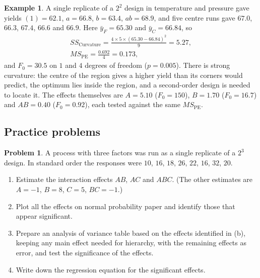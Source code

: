 \documentclass[11pt,a4paper]{article}
\numberwithin{equation}{section}
\theoremstyle{definition}
\newtheorem{exa}[thm]{Example}
\newtheorem{problemx}{Problem}[subsection]
\newenvironment{problem}{\begin{problemx}}{\end{problemx}}
\begin{document}
\begin{exa}
A single replicate of a $2^2$ design in temperature and pressure gave yields $(1) = 62.1$, $a = 66.8$, $b = 63.4$, $ab = 68.9$, and five centre runs gave $67.0$,
$66.3$, $67.4$, $66.6$ and $66.9$. Here $\bar y_F = 65.30$ and $\bar y_C = 66.84$, so
\begin{gather*}
SS_{\mathrm{Curvature}} = \frac{4 \times 5 \times (65.30 - 66.84)^2}{9} = 5.27 , \\
MS_{\mathrm{PE}} = \frac{0.692}{4} = 0.173 ,
\end{gather*}
and $F_0 = 30.5$ on $1$ and $4$ degrees of freedom ($p = 0.005$). There is strong curvature: the centre of the region gives a higher yield than its
corners would predict, the optimum lies inside the region, and a second-order design is needed to locate it. The effects themselves are
$A = 5.10$ ($F_0 = 150$), $B = 1.70$ ($F_0 = 16.7$) and $AB = 0.40$ ($F_0 = 0.92$), each tested against the same $MS_{\mathrm{PE}}$.
\end{exa}

\subsection{Practice problems}

\begin{problem}\label{prob:twothree-a}
A process with three factors was run as a single replicate of a $2^3$ design. In standard order the responses were $10$, $16$, $18$, $26$, $22$, $16$, $32$, $20$.
\begin{enumerate}[label=(\alph*)]
\item Estimate the interaction effects $AB$, $AC$ and $ABC$. (The other estimates are $A = -1$, $B = 8$, $C = 5$, $BC = -1$.)
\item Plot all the effects on normal probability paper and identify those that appear significant.
\item Prepare an analysis of variance table based on the effects identified in (b), keeping any main effect needed for hierarchy, with the
remaining effects as error, and test the significance of the effects.
\item Write down the regression equation for the significant effects.
\end{enumerate}
\end{problem}
\end{document}
